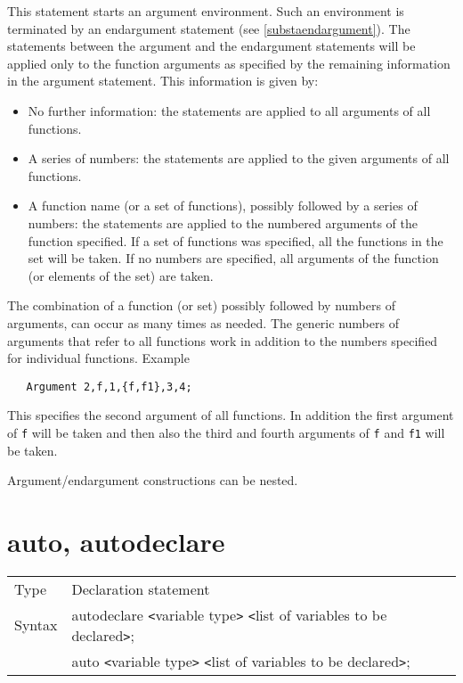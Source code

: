 \noindent This statement starts an argument 
environment. Such an environment is terminated 
by an endargument statement (see \ref{substaendargument}). The statements 
between the argument and the endargument statements will 
be applied only to the function arguments as specified by the remaining 
information in the argument statement. This information is given by:
\begin{itemize}
\item   No further information: the statements are applied to all arguments 
of all functions.
\item   A series of numbers: the statements are applied to the given 
arguments of all functions.
\item   A function name (or a set of functions), possibly followed by a 
series of numbers: the statements are applied to the numbered arguments of 
the function specified. If a set of functions was specified, all the 
functions in the set will be taken. If no numbers are specified, all 
arguments of the function (or elements of the set) are taken.
\end{itemize}
The combination of a function (or set) possibly followed by numbers of 
arguments, can occur as many times as needed. The generic numbers of 
arguments that refer to all functions work in addition to the numbers 
specified for individual functions. Example\vspace{1mm}
\begin{verbatim}
   Argument 2,f,1,{f,f1},3,4;
\end{verbatim}
This specifies the second argument of all functions. In addition the first 
argument of \verb:f: will be taken and then also the third and fourth 
arguments of \verb:f: and \verb:f1: will be taken. \vspace{4mm}

\noindent Argument/endargument constructions can be nested. \vspace{10mm}


\section{auto, autodeclare}
\label{substaautodeclare}

\noindent \begin{tabular}{ll}
Type & Declaration statement\\
Syntax & autodeclare {\tt<}variable type{\tt>} {\tt<}list of variables to be declared{\tt>}; \\
       & auto {\tt<}variable type{\tt>} {\tt<}list of variables to be declared{\tt>};
\end{tabular} \vspace{4mm}

